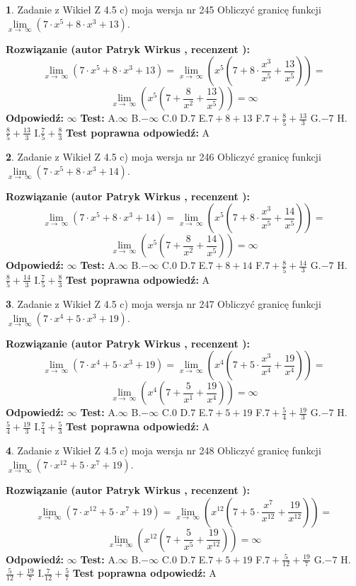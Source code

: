 \documentclass[12pt, a4paper]{article}
\theoremstyle{definition} %
\newtheorem{zad}{}
\newcommand{\zadStart}[1]{\begin{zad}#1\newline}
\newcommand{\zadStop}{\end{zad}}
\newcommand{\rozwStart}[2]{\noindent \textbf{Rozwiązanie (autor #1 , recenzent #2): }\newline}
\newcommand{\rozwStop}{\newline}
\newcommand{\odpStart}{\noindent \textbf{Odpowiedź:}\newline}
\newcommand{\odpStop}{\newline}
\newcommand{\testStart}{\noindent \textbf{Test:}\newline}
\newcommand{\testStop}{\newline}
\newcommand{\kluczStart}{\noindent \textbf{Test poprawna odpowiedź:}\newline}
\newcommand{\kluczStop}{\newline}
\begin{document}
\zadStart{Zadanie z Wikieł Z 4.5 c) moja wersja nr 245}
Obliczyć granicę funkcji  $\lim\limits_{x\to\ \infty}(7 \cdot x^{5}+8 \cdot x^{3}+13)$.
\zadStop
\rozwStart{Patryk Wirkus}{}
$$\lim\limits_{x\to\ \infty}(7 \cdot x^{5}+8 \cdot x^{3}+13) = \lim\limits_{x\to\ \infty}(x^{5}(7 +8 \cdot \frac{x^{3}}{x^{5}}+\frac{13}{x^{5}})) =$$ $$\lim\limits_{x\to\ \infty}(x^{5}(7 +\frac{8}{x^{2}}+\frac{13}{x^{5}})) =\infty$$
\rozwStop
\odpStart
$\infty$
\odpStop
\testStart
A.$\infty$ B.$-\infty$ C.$0$ D.$7$ E.$7 + 8 + 13$
F.$7+\frac{8}{5}+\frac{13}{3}$ G.$-7$
H.$\frac{8}{5}+\frac{13}{3}$
I.$\frac{7}{5}+\frac{8}{3}$
\testStop
\kluczStart
A
\kluczStop



\zadStart{Zadanie z Wikieł Z 4.5 c) moja wersja nr 246}
Obliczyć granicę funkcji  $\lim\limits_{x\to\ \infty}(7 \cdot x^{5}+8 \cdot x^{3}+14)$.
\zadStop
\rozwStart{Patryk Wirkus}{}
$$\lim\limits_{x\to\ \infty}(7 \cdot x^{5}+8 \cdot x^{3}+14) = \lim\limits_{x\to\ \infty}(x^{5}(7 +8 \cdot \frac{x^{3}}{x^{5}}+\frac{14}{x^{5}})) =$$ $$\lim\limits_{x\to\ \infty}(x^{5}(7 +\frac{8}{x^{2}}+\frac{14}{x^{5}})) =\infty$$
\rozwStop
\odpStart
$\infty$
\odpStop
\testStart
A.$\infty$ B.$-\infty$ C.$0$ D.$7$ E.$7 + 8 + 14$
F.$7+\frac{8}{5}+\frac{14}{3}$ G.$-7$
H.$\frac{8}{5}+\frac{14}{3}$
I.$\frac{7}{5}+\frac{8}{3}$
\testStop
\kluczStart
A
\kluczStop



\zadStart{Zadanie z Wikieł Z 4.5 c) moja wersja nr 247}
Obliczyć granicę funkcji  $\lim\limits_{x\to\ \infty}(7 \cdot x^{4}+5 \cdot x^{3}+19)$.
\zadStop
\rozwStart{Patryk Wirkus}{}
$$\lim\limits_{x\to\ \infty}(7 \cdot x^{4}+5 \cdot x^{3}+19) = \lim\limits_{x\to\ \infty}(x^{4}(7 +5 \cdot \frac{x^{3}}{x^{4}}+\frac{19}{x^{4}})) =$$ $$\lim\limits_{x\to\ \infty}(x^{4}(7 +\frac{5}{x^{1}}+\frac{19}{x^{4}})) =\infty$$
\rozwStop
\odpStart
$\infty$
\odpStop
\testStart
A.$\infty$ B.$-\infty$ C.$0$ D.$7$ E.$7 + 5 + 19$
F.$7+\frac{5}{4}+\frac{19}{3}$ G.$-7$
H.$\frac{5}{4}+\frac{19}{3}$
I.$\frac{7}{4}+\frac{5}{3}$
\testStop
\kluczStart
A
\kluczStop



\zadStart{Zadanie z Wikieł Z 4.5 c) moja wersja nr 248}
Obliczyć granicę funkcji  $\lim\limits_{x\to\ \infty}(7 \cdot x^{12}+5 \cdot x^{7}+19)$.
\zadStop
\rozwStart{Patryk Wirkus}{}
$$\lim\limits_{x\to\ \infty}(7 \cdot x^{12}+5 \cdot x^{7}+19) = \lim\limits_{x\to\ \infty}(x^{12}(7 +5 \cdot \frac{x^{7}}{x^{12}}+\frac{19}{x^{12}})) =$$ $$\lim\limits_{x\to\ \infty}(x^{12}(7 +\frac{5}{x^{5}}+\frac{19}{x^{12}})) =\infty$$
\rozwStop
\odpStart
$\infty$
\odpStop
\testStart
A.$\infty$ B.$-\infty$ C.$0$ D.$7$ E.$7 + 5 + 19$
F.$7+\frac{5}{12}+\frac{19}{7}$ G.$-7$
H.$\frac{5}{12}+\frac{19}{7}$
I.$\frac{7}{12}+\frac{5}{7}$
\testStop
\kluczStart
A
\kluczStop
\end{document}

